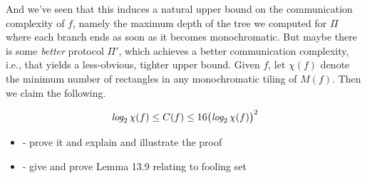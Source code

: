 \documentclass[12pt]{article}
\begin{document}
And we've seen that this induces a natural upper bound on the communication complexity of $f$,
namely the maximum depth of the tree we computed for $\Pi$ where each branch ends as soon as it
becomes monochromatic.
But maybe there is some \emph{better} protocol $\Pi'$, which achieves a better communication complexity,
i.e., that yields a less-obvious, tighter upper bound.
Given $f$, let $\chi(f)$ denote the minimum number of rectangles in any monochromatic tiling of $M(f)$.
Then we claim the following.
\begin{theorem}
\[\emph{log}_2 \, \chi(f) \leq
C(f) \leq
16\big(\emph{log}_2 \, \chi(f) \big)^2\]
\end{theorem}
\begin{itemize}
\item \TODO - prove it and explain and illustrate the proof
\item \TODO - give and prove Lemma 13.9 relating to fooling set
\end{itemize}



% 
% 
\end{document}
